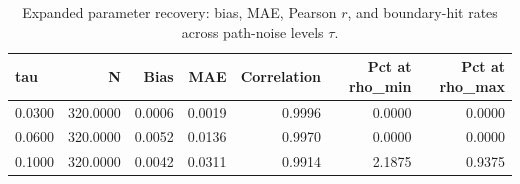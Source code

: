 \begin{table}[htbp]
\centering
\caption{Expanded parameter recovery: bias, MAE, Pearson $r$, and boundary-hit rates across path-noise levels $\tau$.}
\label{tab:recovery-expansion}
\begin{tabular}{lrrrrrr}
\toprule
tau & N & Bias & MAE & Correlation & Pct at rho\_min & Pct at rho\_max \\
\midrule
0.0300 & 320.0000 & 0.0006 & 0.0019 & 0.9996 & 0.0000 & 0.0000 \\
0.0600 & 320.0000 & 0.0052 & 0.0136 & 0.9970 & 0.0000 & 0.0000 \\
0.1000 & 320.0000 & 0.0042 & 0.0311 & 0.9914 & 2.1875 & 0.9375 \\
\bottomrule
\end{tabular}
\end{table}